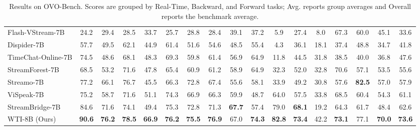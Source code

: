 \begin{table}[t]
{\begin{tabular}{l|cccccc|c|ccc|c|ccc|c|c}
    \hline
    Flash-VStream-7B & 24.2 & 29.4 & 28.5 & 33.7 & 25.7 & 28.8 & 28.4 & 39.1 & 37.2 & 5.9 & 27.4 & 8.0 & 67.3 & 60.0 & 45.1 & 33.6 \\
    Dispider-7B & 57.7 & 49.5 & 62.1 & 44.9 & 61.4 & 51.6 & 54.6 & 48.5 & 55.4 & 4.3 & 36.1 & 18.1 & 37.4 & 48.8 & 34.7 & 41.8 \\
    TimeChat-Online-7B & 74.5 & 48.6 & 68.1 & 48.3 & 69.3 & 59.8 & 61.4 & 56.9 & 64.9 & 11.8 & 44.5 & 31.8 & 38.5 & 40.0 & 36.8 & 47.6 \\
    StreamForest-7B & 68.5 & 53.2 & 71.6 & 47.8 & 65.4 & 60.9 & 61.2 & 58.9 & 64.9 & 32.3 & 52.0 & 32.8 & 70.6 & 57.1 & 53.5 & 55.6 \\
    Streamo-7B & 77.2 & 66.1 & 76.7 & 45.5 & 66.3 & 72.8 & 67.4 & 55.6 & 58.1 & 33.9 & 49.2 & 30.8 & 57.6 & \textbf{82.5} & 57.0 & 57.9 \\
    ViSpeak-7B & 75.2 & 58.7 & 71.6 & 51.1 & 74.3 & 66.9 & 66.3 & 59.9 & 48.7 & 64.0 & 57.5 & 33.8 & 68.5 & 60.4 & 54.3 & 61.1 \\
    StreamBridge-7B & 84.6 & 71.6 & 74.1 & 49.4 & 75.3 & 72.8 & 71.3 & \textbf{67.7} & 57.4 & 79.0 & \textbf{68.1} & 19.2 & 64.3 & 61.7 & 48.4 & 62.6 \\
    \rowcolor{softblue}
    WTI-8B (Ours) & \textbf{90.6} & \textbf{76.2} & \textbf{78.5} & \textbf{66.9} & \textbf{76.2} & \textbf{75.5} & \textbf{76.9} & 67.0 & \textbf{74.3} & \textbf{82.8} & \textbf{73.4} & 42.2 & \textbf{73.1} & 77.1 & \textbf{70.0} & \textbf{73.6} \\
    \hline
  \end{tabular}}
  \caption{Results on OVO-Bench. Scores are grouped by Real-Time, Backward, and Forward tasks; Avg. reports group averages and Overall reports the benchmark average.}
  \label{tab:ovobench_main}
\end{table}
